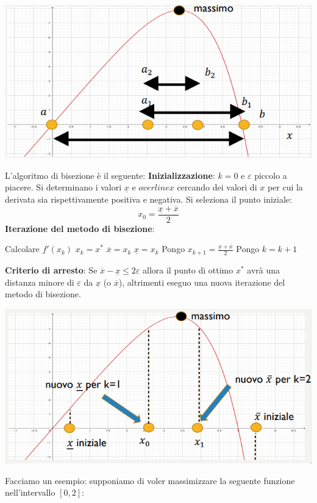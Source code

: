 \documentclass[12pt]{article}
\begin{document}
\begin{center}
    \includegraphics[width = 0.70\linewidth]{Images/95.png}
\end{center}
L'algoritmo di bisezione è il seguente: \newline
\textbf{Inizializzazione}: \newline
$k = 0$ e $\varepsilon$ piccolo a piacere.
Si determinano i valori $\underline{x}$ e $overline{x}$ cercando dei valori di $x$ per cui la derivata sia rispettivamente positiva e negativa.
Si seleziona il punto iniziale:
$$x_0 = \frac{\underline{x} + \overline{x}}{2}$$
\textbf{Iterazione del metodo di bisezione}: \newline
\begin{algorithm}[H]
\DontPrintSemicolon
Calcolare $f'(x_k)$ \;
{
    $x_k = x^*$\;
} {
    {
        $\overline{x} = x_k$\;
    } 
    {
        $\underline{x} = x_k$\;
    }
}
Pongo $x_{k+1} = \frac{\underline{x} + \overline{x}}{2}$ \;
Pongo $k = k + 1$ \;
\end{algorithm}
\noindent
\textbf{Criterio di arresto}: \newline
Se $\overline{x} - \underline{x} \leq 2\varepsilon$ allora il punto di ottimo $x^*$ avrà una distanza minore di $\varepsilon$ da $\underline{x}$ (o $\overline{x}$),
altrimenti eseguo una nuova iterazione del metodo di bisezione.
\begin{center}
    \includegraphics[width = 0.75\linewidth]{Images/96.PNG}
\end{center}
Facciamo un esempio: supponiamo di voler massimizzare la seguente funzione nell'intervallo $[0,2]$:
\end{document}
